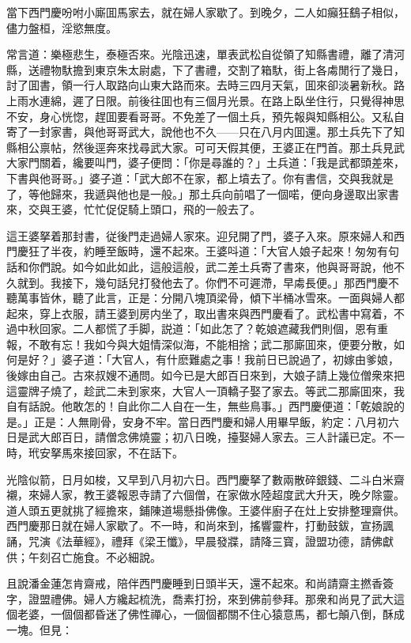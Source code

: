 當下西門慶吩咐小廝囬馬家去，就在婦人家歇了。到晚夕，二人如癲狂鷂子相似，儘力盤桓，淫慾無度。

常言道：樂極悲生，泰極否來。光陰迅速，單表武松自從領了知縣書禮，離了清河縣，送禮物馱擔到東京朱太尉處，下了書禮，交割了箱馱，街上各䖏閒行了幾日，討了囬書，領一行人取路向山東大路而來。去時三四月天氣，囬來卻淡暑新秋。路上雨水連綿，遲了日限。前後往囬也有三個月光景。在路上臥坐住行，只覺得神思不安，身心恍惚，趕囬要看哥哥。不免差了一個土兵，預先報與知縣相公。又私自寄了一封家書，與他哥哥武大，說他也不久——只在八月内囬還。那土兵先下了知縣相公禀帖，然後逕奔來找尋武大家。可可天假其便，王婆正在門首。那土兵見武大家門關着，纔要叫門，婆子便問：「你是尋誰的？」土兵道：「我是武都頭差來，下書與他哥哥。」婆子道：「武大郎不在家，都上墳去了。你有書信，交與我就是了，等他歸來，我遞與他也是一般。」那土兵向前唱了一個喏，便向身邊取出家書來，交與王婆，忙忙促促騎上頭口，飛的一般去了。

這王婆拏着那封書，従後門走過婦人家來。迎兒開了門，婆子入來。原來婦人和西門慶狂了半夜，約睡至飯時，還不起來。王婆呌道：「大官人娘子起來！匆匆有句話和你們說。如今如此如此，這般這般，武二差土兵寄了書來，他與哥哥說，他不久就到。我接下，幾句話兒打發他去了。你們不可遲滯，早䖏長便。」那西門慶不聽萬事皆休，聽了此言，正是：分開八塊頂梁骨，傾下半桶冰雪來。一面與婦人都起來，穿上衣服，請王婆到房内坐了，取出書來與西門慶看了。武松書中寫着，不過中秋回家。二人都慌了手脚，説道：「如此怎了？乾娘遮藏我們則個，恩有重報，不敢有忘！我如今與大姐情深似海，不能相捨；武二那廝囬來，便要分散，如何是好？」婆子道：「大官人，有什麽難處之事！我前日已說過了，初嫁由爹娘，後嫁由自己。古來叔嫂不通問。如今已是大郎百日來到，大娘子請上幾位僧衆來把這靈牌子燒了，趁武二未到家來，大官人一頂轎子娶了家去。等武二那廝囬來，我自有話說。他敢怎的！自此你二人自在一生，無些鳥事。」西門慶便道：「乾娘說的是。」正是：人無剛骨，安身不牢。當日西門慶和婦人用畢早飯，約定：八月初六日是武大郎百日，請僧念佛燒靈；初八日晚，擡娶婦人家去。三人計議已定。不一時，玳安拏馬來接回家，不在話下。

光陰似箭，日月如梭，又早到八月初六日。西門慶拏了數兩散碎銀錢、二斗白米齋襯，來婦人家，教王婆報恩寺請了六個僧，在家做水陸超度武大升天，晚夕除靈。道人頭五更就挑了經擔來，鋪陳道場懸掛佛像。王婆伴廚子在灶上安排整理齋供。西門慶那日就在婦人家歇了。不一時，和尚來到，搖響靈杵，打動鼓鈸，宣扬諷誦，咒演《法華經》，禮拜《梁王懺》，早晨發牃，請降三寳，證盟功德，請佛獻供；午刻召亡施食。不必細說。

且說潘金蓮怎肯齋戒，陪伴西門慶睡到日頭半天，還不起來。和尚請齋主撚香簽字，證盟禮佛。婦人方纔起梳洗，喬素打扮，來到佛前參拜。那衆和尚見了武大這個老婆，一個個都昏迷了佛性禪心，一個個都關不住心猿意馬，都七顛八倒，酥成一塊。但見：

